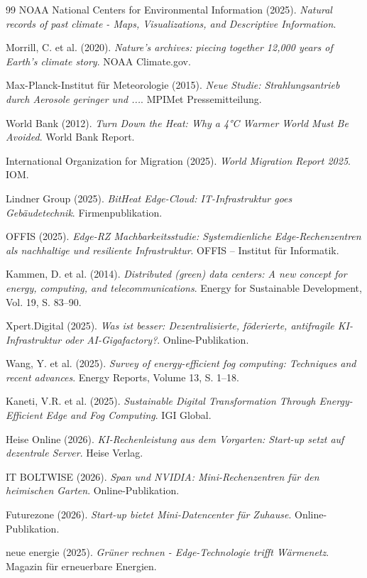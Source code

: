 \documentclass[12pt, a4paper]{article}
\begin{document}
\begin{thebibliography}{99}
		NOAA National Centers for Environmental Information (2025). \textit{Natural records of past climate - Maps, Visualizations, and Descriptive Information}.
		
		Morrill, C. et al. (2020). \textit{Nature’s archives: piecing together 12,000 years of Earth’s climate story}. NOAA Climate.gov.
		
		Max-Planck-Institut für Meteorologie (2015). \textit{Neue Studie: Strahlungsantrieb durch Aerosole geringer und ...}. MPIMet Pressemitteilung.
		
		World Bank (2012). \textit{Turn Down the Heat: Why a 4°C Warmer World Must Be Avoided}. World Bank Report.
		
		International Organization for Migration (2025). \textit{World Migration Report 2025}. IOM.
		
		Lindner Group (2025). \textit{BitHeat Edge-Cloud: IT-Infrastruktur goes Gebäudetechnik}. Firmenpublikation.
		
		OFFIS (2025). \textit{Edge-RZ Machbarkeitsstudie: Systemdienliche Edge-Rechenzentren als nachhaltige und resiliente Infrastruktur}. OFFIS – Institut für Informatik.
		
		Kammen, D. et al. (2014). \textit{Distributed (green) data centers: A new concept for energy, computing, and telecommunications}. Energy for Sustainable Development, Vol. 19, S. 83–90.
		
		Xpert.Digital (2025). \textit{Was ist besser: Dezentralisierte, föderierte, antifragile KI-Infrastruktur oder AI-Gigafactory?}. Online-Publikation.
		
		Wang, Y. et al. (2025). \textit{Survey of energy-efficient fog computing: Techniques and recent advances}. Energy Reports, Volume 13, S. 1–18.
		
		Kaneti, V.R. et al. (2025). \textit{Sustainable Digital Transformation Through Energy-Efficient Edge and Fog Computing}. IGI Global.
		
		Heise Online (2026). \textit{KI-Rechenleistung aus dem Vorgarten: Start-up setzt auf dezentrale Server}. Heise Verlag.
		
		IT BOLTWISE (2026). \textit{Span und NVIDIA: Mini-Rechenzentren für den heimischen Garten}. Online-Publikation.
		
		Futurezone (2026). \textit{Start-up bietet Mini-Datencenter für Zuhause}. Online-Publikation.
		
		neue energie (2025). \textit{Grüner rechnen - Edge-Technologie trifft Wärmenetz}. Magazin für erneuerbare Energien.
		
	\end{thebibliography}
	
\end{document}
